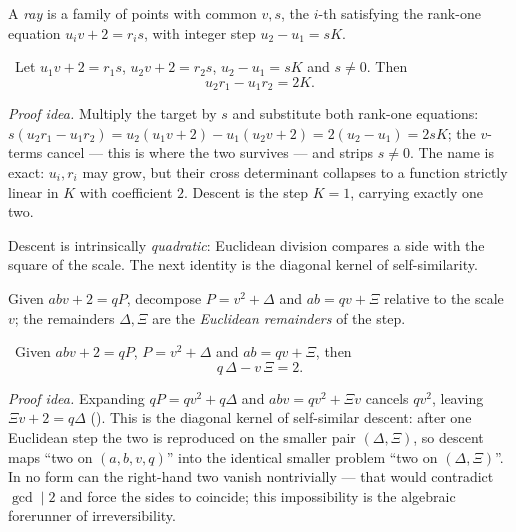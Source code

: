 \begin{definition}\label{def:ray}
A \emph{ray} is a family of points with common $v,s$, the $i$-th satisfying the rank-one equation
$u_i v+2=r_i s$, with integer step $u_2-u_1=sK$.
\end{definition}

\begin{theorem}\label{thm:det_collapse}
\green{}\ Let $u_1 v+2=r_1 s$, $u_2 v+2=r_2 s$, $u_2-u_1=sK$ and $s\ne 0$. Then
\begin{equation}\label{eq:detcollapse}
u_2 r_1-u_1 r_2=2K.
\end{equation}
\end{theorem}

\emph{Proof idea.} Multiply the target by $s$ and substitute both rank-one equations:
$s(u_2 r_1-u_1 r_2)=u_2(u_1 v+2)-u_1(u_2 v+2)=2(u_2-u_1)=2sK$; the $v$-terms cancel --- this is where
the two survives --- and  strips $s\ne 0$. The name is exact:
$u_i,r_i$ may grow, but their cross determinant collapses to a function strictly linear in $K$ with
coefficient $2$. Descent is the step $K=1$, carrying exactly one two.

Descent is intrinsically \emph{quadratic}: Euclidean division compares a side with the square of the
scale. The next identity is the diagonal kernel of self-similarity.

\begin{definition}\label{def:euclid-decomp}
Given $abv+2=qP$, decompose $P=v^2+\Delta$ and $ab=qv+\Xi$ relative to the scale $v$; the remainders
$\Delta,\Xi$ are the \emph{Euclidean remainders} of the step.
\end{definition}

\begin{theorem}\label{thm:euclid_descent_identity}
\green{}\ Given $abv+2=qP$, $P=v^2+\Delta$ and $ab=qv+\Xi$, then
\begin{equation}\label{eq:euclid-descent}
q\,\Delta-v\,\Xi=2.
\end{equation}
\end{theorem}

\emph{Proof idea.} Expanding $qP=qv^2+q\Delta$ and $abv=qv^2+\Xi v$ cancels $qv^2$, leaving
$\Xi v+2=q\Delta$ (). This is the diagonal kernel of
self-similar descent: after one Euclidean step the two is reproduced on the smaller pair
$(\Delta,\Xi)$, so descent maps ``two on $(a,b,v,q)$'' into the identical smaller problem ``two on
$(\Delta,\Xi)$''. In no form can the right-hand two vanish nontrivially --- that would contradict
$\gcd\mid 2$ and force the sides to coincide; this impossibility is the algebraic forerunner of
irreversibility.

